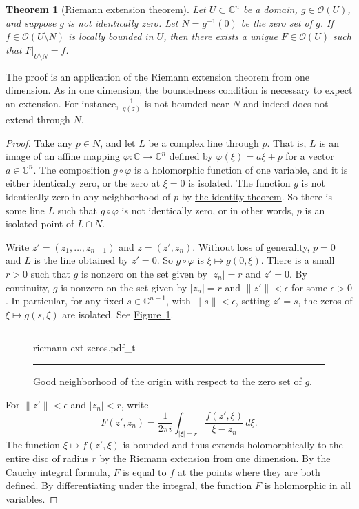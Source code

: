 \documentclass[12pt,openany]{book}
\newcommand{\sabs}[1]{\lvert {#1} \rvert}
\newcommand{\snorm}[1]{\lVert {#1} \rVert}
\newcommand{\abs}[1]{\left\lvert {#1} \right\rvert}
\newcommand{\C}{{\mathbb{C}}}
\newcommand{\sO}{{\mathscr{O}}}
\newcommand{\myindex}[1]{#1\index{#1}}
\theoremstyle{plain}
\newtheorem{thm}{Theorem}[section]
\theoremstyle{remark}
\theoremstyle{definition}
\newenvironment{myfig}{%
\begin{figure}[h!t]
\noindent\rule{\textwidth}{0.5pt}\vspace{12pt}\par\centering}%
{\par\noindent\rule{\textwidth}{0.5pt}
\end{figure}}
\theoremstyle{exercise}
\theoremstyle{example}
\newcommand{\figureref}[1]{\hyperref[#1]{Figure~\ref*{#1}}}
\begin{document}
\begin{thm}[\myindex{Riemann extension theorem}]
Let $U \subset \C^n$ be a domain, $g \in \sO(U)$, and suppose $g$ is not
identically zero.  Let
$N = g^{-1}(0)$ be the zero set of $g$.
If $f \in \sO(U \setminus N)$ is locally bounded in $U$,
then there exists a unique $F \in \sO(U)$ such that $F|_{U \setminus N} = f$.
\end{thm}

The proof is an application of the Riemann extension theorem from one dimension.
As in one dimension, the boundedness condition is necessary to
expect an extension.  For instance, $\frac{1}{g(z)}$ is not bounded near $N$
and indeed does not extend through $N$.

\begin{proof}
Take any $p \in N$, and let $L$ be a complex line through $p$.
That is,
$L$ is an image of an affine mapping
$\varphi \colon \C \to \C^n$ defined by
$\varphi(\xi) = a\xi + p$ for a vector $a \in \C^n$.
The composition $g \circ \varphi$
is a holomorphic function of one variable, and it
is either identically zero, or
the zero at $\xi=0$ is isolated.
The function $g$ is not identically zero in any neighborhood of $p$
by \hyperref[thm:identity]{the identity theorem}.
So there is some line $L$ such that $g \circ \varphi$
is not identically zero, or in other words, $p$
is an isolated point of $L \cap N$.

Write $z' =
(z_1,\ldots,z_{n-1})$ and $z=(z',z_n)$.
Without loss of generality, $p = 0$ and $L$ is the line
obtained by $z' = 0$.
So $g \circ \varphi$ is $\xi \mapsto g(0,\xi)$.
There is a small
$r > 0$ such that $g$ is nonzero on the set
given by $\sabs{z_n} = r$ and $z' = 0$.
By continuity,
$g$ is nonzero on the set given by
$\sabs{z_n} = r$ and $\snorm{z'} <\epsilon$ for some $\epsilon >0$.
In particular, for any fixed $s \in \C^{n-1}$, with $\snorm{s} < \epsilon$,
setting $z' = s$,
the zeros of $\xi \mapsto g(s,\xi)$ are isolated.  See
\figureref{fig:riemann-ext-zeros}.

\begin{myfig}
{riemann-ext-zeros.pdf_t}
\caption{Good neighborhood of the origin with respect to
the zero set of $g$.\label{fig:riemann-ext-zeros}}
\end{myfig}

For $\snorm{z'} <
\epsilon$ and $\abs{z_n} < r$, write
\begin{equation*}
F(z',z_n) =
\frac{1}{2\pi i}
\int_{\sabs{\xi}=r} \frac{f(z',\xi)}{\xi-z_n} \,d\xi .
\end{equation*}
The function $\xi \mapsto f(z',\xi)$ is bounded and thus extends holomorphically to the entire
disc of radius $r$ by the Riemann extension from one dimension.  By the Cauchy
integral formula,
$F$ is equal to $f$ at the points where they are both defined.
By differentiating under the integral, the function $F$ is holomorphic
in all variables.


\end{proof}
\end{document}
